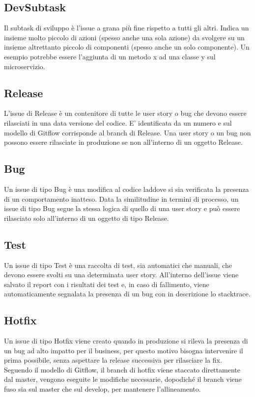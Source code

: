 \documentclass[a4paper, 12pt]{report}
\numberwithin{equation}{section}
\begin{document}
\subsection{DevSubtask}
Il subtask di sviluppo è l’issue a grana più fine rispetto a tutti gli altri. Indica un insieme molto piccolo di azioni (spesso anche una sola azione) da svolgere su un insieme altrettanto piccolo di componenti (spesso anche un solo componente). Un esempio potrebbe essere l’aggiunta di un metodo x ad una classe y sul microservizio.

\subsection{Release}
L’issue di Release è un contenitore di tutte le user story o bug che devono essere rilasciati in una data versione del codice. E’ identificata da un numero e sul modello di Gitflow corrisponde al branch di Release. Una user story o un bug non possono essere rilasciate in produzione se non all'interno di un oggetto Release.

\subsection{Bug}
Un issue di tipo Bug è una modifica al codice laddove si sia verificata la presenza di un comportamento inatteso. Data la similitudine in termini di processo, un issue di tipo Bug segue la stessa logica di quello di una user story e può essere rilasciato solo all’interno di un oggetto di tipo Release.

\subsection{Test}
Un issue di tipo Test è una raccolta di test, sia automatici che manuali, che devono essere svolti su una determinata user story. All’interno dell’issue viene salvato il report con i risultati dei test e, in caso di fallimento, viene automaticamente segnalata la presenza di un bug con in descrizione lo stacktrace.

\subsection{Hotfix}
Un issue di tipo Hotfix viene creato quando in produzione si rileva la presenza di un bug ad alto impatto per il business, per questo motivo bisogna intervenire il prima possibile, senza aspettare la release successiva per rilasciare la fix. Seguendo il modello di Gitflow, il branch di hotfix viene staccato direttamente dal master, vengono eseguite le modifiche necessarie, dopodiché il branch viene fuso sia sul master che sul develop, per mantenere l’allineamento.
\end{document}
